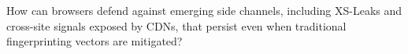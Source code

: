 \begin{opbox}
How can browsers defend against emerging side channels, including XS-Leaks and cross-site signals exposed by CDNs, that persist even when traditional fingerprinting vectors are mitigated?
\end{opbox}









